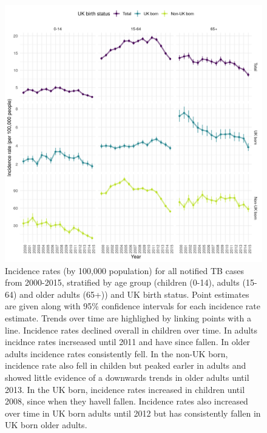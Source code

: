 \documentclass[11pt,twoside]{bristolthesis}
\begin{document}
  \begin{figure}
  
  {\centering \includegraphics[width=0.8\linewidth,]{chapters/tb-epi-england/figures/plot-age-inc-rates} 
  
  }
  
  \caption[Incidence rates (by 100,000 population) for all notified TB cases from 2000-2015, stratified by age group (children (0-14), adults (15-64) and older adults (65+)) and UK birth status.]{Incidence rates (by 100,000 population) for all notified TB cases from 2000-2015, stratified by age group (children (0-14), adults (15-64) and older adults (65+)) and UK birth status. Point estimates are given along with 95\% confidence intervals for each incidence rate estimate. Trends over time are highlighed by linking points with a line. Incidence rates declined overall in children over time. In adults incidnce rates incrseased until 2011 and have since fallen. In older adults incidence rates consistently fell. In the non-UK born, incidence rate also fell in childen but peaked earler in adults and showed little evidence of a downwards trends in older adults until 2013. In the UK born, incidence rates increased in children until 2008, since when they havell fallen. Incidence rates also increased over time in UK born adults until 2012 but has consistently fallen in UK born older adults.}\label{fig:plot-age-inc-rates}
  \end{figure}
\end{document}
